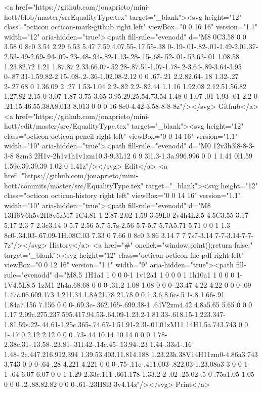 {      <a href="https://github.com/jonaprieto/mini-hott/blob/master/srcEqualityType.tex" target="_blank"><svg height="12" class="octicon octicon-mark-github right left" viewBox="0 0 16 16" version="1.1" width="12" aria-hidden="true"><path fill-rule="evenodd" d="M8 0C3.58 0 0 3.58 0 8c0 3.54 2.29 6.53 5.47 7.59.4.07.55-.17.55-.38 0-.19-.01-.82-.01-1.49-2.01.37-2.53-.49-2.69-.94-.09-.23-.48-.94-.82-1.13-.28-.15-.68-.52-.01-.53.63-.01 1.08.58 1.23.82.72 1.21 1.87.87 2.33.66.07-.52.28-.87.51-1.07-1.78-.2-3.64-.89-3.64-3.95 0-.87.31-1.59.82-2.15-.08-.2-.36-1.02.08-2.12 0 0 .67-.21 2.2.82.64-.18 1.32-.27 2-.27.68 0 1.36.09 2 .27 1.53-1.04 2.2-.82 2.2-.82.44 1.1.16 1.92.08 2.12.51.56.82 1.27.82 2.15 0 3.07-1.87 3.75-3.65 3.95.29.25.54.73.54 1.48 0 1.07-.01 1.93-.01 2.2 0 .21.15.46.55.38A8.013 8.013 0 0 0 16 8c0-4.42-3.58-8-8-8z"/></svg> Github</a>
      <a href="https://github.com/jonaprieto/mini-hott/edit/master/src/EqualityType.tex" target="_blank"><svg height="12" class="octicon octicon-pencil right left" viewBox="0 0 14 16" version="1.1" width="10" aria-hidden="true"><path fill-rule="evenodd" d="M0 12v3h3l8-8-3-3-8 8zm3 2H1v-2h1v1h1v1zm10.3-9.3L12 6 9 3l1.3-1.3a.996.996 0 0 1 1.41 0l1.59 1.59c.39.39.39 1.02 0 1.41z"/></svg> Edit</a>
      <a href="https://github.com/jonaprieto/mini-hott/commits/master/src/EqualityType.tex" target="_blank"><svg height="12" class="octicon octicon-history right left" viewBox="0 0 14 16" version="1.1" width="10" aria-hidden="true"><path fill-rule="evenodd" d="M8 13H6V6h5v2H8v5zM7 1C4.81 1 2.87 2.02 1.59 3.59L0 2v4h4L2.5 4.5C3.55 3.17 5.17 2.3 7 2.3c3.14 0 5.7 2.56 5.7 5.7s-2.56 5.7-5.7 5.7A5.71 5.71 0 0 1 1.3 8c0-.34.03-.67.09-1H.08C.03 7.33 0 7.66 0 8c0 3.86 3.14 7 7 7s7-3.14 7-7-3.14-7-7-7z"/></svg> History</a>
      <a  href="#" onclick="window.print();return false;" target="_blank"><svg height="12" class="octicon octicon-file-pdf right left" viewBox="0 0 12 16" version="1.1" width="9" aria-hidden="true"><path fill-rule="evenodd" d="M8.5 1H1a1 1 0 0 0-1 1v12a1 1 0 0 0 1 1h10a1 1 0 0 0 1-1V4.5L8.5 1zM1 2h4a.68.68 0 0 0-.31.2 1.08 1.08 0 0 0-.23.47 4.22 4.22 0 0 0-.09 1.47c.06.609.173 1.211.34 1.8A21.78 21.78 0 0 1 3.6 8.6c-.5 1-.8 1.66-.91 1.84a7.156 7.156 0 0 0-.69.3c-.362.165-.699.38-1 .64V2zm4.42 4.8a5.65 5.65 0 0 0 1.17 2.09c.275.237.595.417.94.53-.64.09-1.23.2-1.81.33-.618.15-1.223.347-1.81.59s.22-.44.61-1.25c.365-.74.67-1.51.91-2.3l-.01.01zM11 14H1.5a.743.743 0 0 1-.17 0 2.12 2.12 0 0 0 .73-.44 10.14 10.14 0 0 0 1.78-2.38c.31-.13.58-.23.81-.31l.42-.14c.45-.13.94-.23 1.44-.33s1-.16 1.48-.2c.447.216.912.394 1.39.53.403.11.814.188 1.23.23h.38V14H11zm0-4.86a3.743 3.743 0 0 0-.64-.28 4.221 4.221 0 0 0-.75-.11c-.411.003-.822.03-1.23.08a3 3 0 0 1-1-.64 6.07 6.07 0 0 1-1.29-2.33c.111-.661.178-1.33.2-2 .02-.25.02-.5 0-.75a1.05 1.05 0 0 0-.2-.88.82.82 0 0 0-.61-.23H8l3 3v4.14z"/></svg> Print</a>
}

